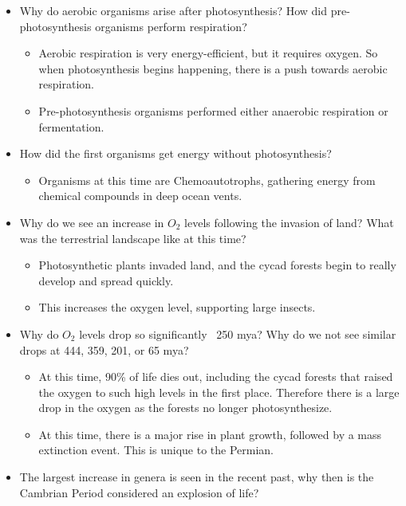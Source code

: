 \documentclass[12pt]{article}
\begin{document}
\begin{itemize}
    \item Why do aerobic organisms arise after photosynthesis? How did pre-photosynthesis organisms perform respiration?
    \begin{itemize}
        \item Aerobic respiration is very energy-efficient, but it requires oxygen. So when photosynthesis begins happening, there is a push towards aerobic respiration.
        \item Pre-photosynthesis organisms performed either anaerobic respiration or fermentation.
    \end{itemize}
    \item How did the first organisms get energy without photosynthesis?
    \begin{itemize}
        \item Organisms at this time are Chemoautotrophs, gathering energy from chemical compounds in deep ocean vents.
    \end{itemize}
    \item Why do we see an increase in $O_2$ levels following the invasion of land? What was the terrestrial landscape like at this time?
    \begin{itemize}
        \item Photosynthetic plants invaded land, and the cycad forests begin to really develop and spread quickly.
        \item This increases the oxygen level, supporting large insects.
    \end{itemize}
    \item Why do $O_2$ levels drop so significantly ~250 mya? Why do we not see similar drops at 444, 359, 201, or 65 mya? 
    \begin{itemize}
        \item At this time, 90\% of life dies out, including the cycad forests that raised the oxygen to such high levels in the first place. Therefore there is a large drop in the oxygen as the forests no longer photosynthesize.
        \item At this time, there is a major rise in plant growth, followed by a mass extinction event. This is unique to the Permian. 
    \end{itemize}
    \item The largest increase in genera is seen in the recent past, why then is the Cambrian Period considered an explosion of life?
    \begin{itemize}

\end{itemize}
\end{itemize}
\end{document}
